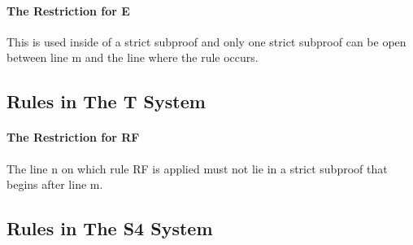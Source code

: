 \paragraph{The Restriction for \ebox E}
This is used inside of a strict subproof and only one strict subproof can be open between line m and the line where the rule occurs. 

\begin{fitchproof}
\open
{}
	
\end{fitchproof}	


\subsection*{Rules in The T System}
\paragraph{The Restriction for RF}
The line n on which rule RF is applied must not lie in a strict subproof that begins after line m.

\begin{multicols}{2}
\begin{fitchproof}
\end{fitchproof}

\begin{fitchproof}
\end{fitchproof}
\end{multicols}

\subsection*{Rules in The S4 System}
\begin{multicols}{2}
\begin{fitchproof}
\end{fitchproof}

\begin{fitchproof}
\end{fitchproof}
\end{multicols}

